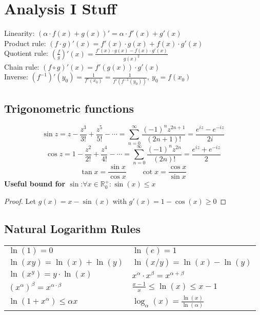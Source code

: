 \documentclass[a4paper, 10pt]{article}
\theoremstyle{definition}
\newcommand{\R}{\mathbb{R}}
\begin{document}
\pagebreak
\section*{Analysis I Stuff}
\begin{ntheorem*}
    Linearity: \((\alpha \cdot f(x) + g(x))' = \alpha \cdot f'(x) + g'(x)\) \\
    Product rule: \((f \cdot g)'(x) = f'(x)\cdot g(x) + f(x)\cdot g'(x)\) \\
    Quotient rule: \(\left(\frac{f}{g}\right)'(x) = \frac{f'(x)\cdot g(x) - f(x)\cdot g'(x)}{g(x)^2}\) \\
    Chain rule: \((f \circ g)'(x) = f'(g(x))\cdot g'(x)\) \\
    Inverse: \((f^{-1})'(y_0) = \frac{1}{f'(x_0)} = \frac{1}{f'(f^{-1}(y_0))}, \ y_0 = f(x_0)\)
\end{ntheorem*}

\subsection*{Trigonometric functions}
\[\sin z = z - \frac{z^3}{3!} + \frac{z^5}{5!} - \cdots = \sum_{n = 0}^\infty \frac{(-1)^n z^{2n + 1}}{(2n + 1)!} = \frac{e^{iz}-e^{-iz}}{2i}\]
\[\cos z = 1 - \frac{z^2}{2!} + \frac{z^4}{4!} - \cdots = \sum_{n = 0}^\infty \frac{(-1)^n z^{2n}}{(2n)!} = \frac{e^{iz}+e^{-iz}}{2}\]
\[\tan x = \frac{\sin x}{\cos x} \qquad \cot x = \frac{\cos x}{\sin x}\]
\textbf{Useful bound for \(\sin\)}:\(\forall x \in \R^+_0: \sin(x) \leq x\)
\begin{proof}
    Let \(g(x) = x - \sin(x)\) with \(g'(x) = 1 - \cos(x) \geq 0\)
\end{proof}

\subsection*{Natural Logarithm Rules}
\begin{tabularx}{\linewidth}{XX}
    $\ln(1) = 0$ & $\ln(e) = 1$ \\
    $\ln(xy) = \ln(x) + \ln(y)$ & $\ln(x/y) = \ln(x) - \ln(y)$ \\
    $\ln(x^y) = y \cdot \ln(x)$ & $x^\alpha \cdot x^\beta = x^{\alpha + \beta}$ \\
    $(x^\alpha)^\beta = x^{\alpha \cdot \beta}$ & $\frac{x - 1}{x} \leq \ln(x) \leq x - 1$ \\
    $\ln(1 + x^\alpha) \leq \alpha x$ & $\log_\alpha(x) = \frac{\ln(x)}{\ln(\alpha)}$
\end{tabularx}
\end{document}

